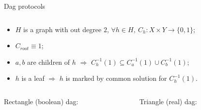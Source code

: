 \begin{frame}{Dag protocols}
    \vspace{-0.8cm}
    \begin{columns}[t]
        \begin{column}{0.58\textwidth}
            \begin{itemize}
                \item $H$ is a graph with out degree $2$, $\forall h \in H, ~ C_h: X \times Y \to \{0,
                    1\}$;
                \item $C_{root} \equiv 1$;
                \item $a, b$ are children of $h$ $\Rightarrow$ $C_{h}^{-1}(1) \subseteq C_{a}^{-1}(1)
                    \cup C_{b}^{-1}(1)$;
                \item $h$ is a leaf $\Rightarrow$ $h$ is marked by common solution for $C_h^{-1}(1)$.
            \end{itemize}
        \end{column}

		\begin{column}{0.38\textwidth}
            \begin{center}
                
            \end{center}
		\end{column}
	\end{columns}

    \pause
    \begin{columns}[t]
		\begin{column}{0.48\textwidth}
            \begin{center}
                Rectangle (boolean) dag:
                \vspace{0.2cm}
                
            \end{center}
        \end{column}

		\begin{column}{0.48\textwidth}
            \begin{center}
                Triangle (real) dag:
                \vspace{0.2cm}
                
            \end{center}
		\end{column}
	\end{columns}
\end{frame}


